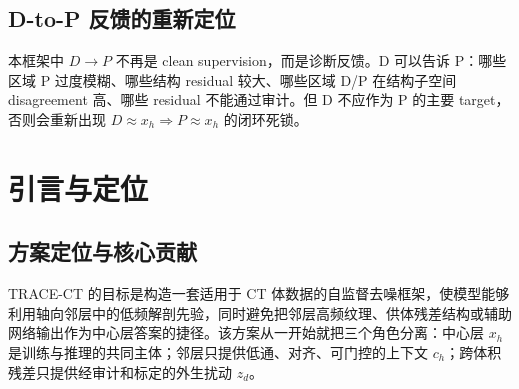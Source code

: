 \documentclass[11pt,a4paper,UTF8,fontset=fandol]{ctexart}
\theoremstyle{definition}
\begin{document}
\subsection{D-to-P 反馈的重新定位}

本框架中 $D\to P$ 不再是 clean supervision，而是诊断反馈。D 可以告诉 P：哪些区域 P 过度模糊、哪些结构 residual 较大、哪些区域 D/P 在结构子空间 disagreement 高、哪些 residual 不能通过审计。但 D 不应作为 P 的主要 target，否则会重新出现 $D\approx x_h\Rightarrow P\approx x_h$ 的闭环死锁。

\section{引言与定位}





\subsection{方案定位与核心贡献}

TRACE-CT 的目标是构造一套适用于 CT 体数据的自监督去噪框架，使模型能够利用轴向邻层中的低频解剖先验，同时避免把邻层高频纹理、供体残差结构或辅助网络输出作为中心层答案的捷径。该方案从一开始就把三个角色分离：中心层 $x_h$ 是训练与推理的共同主体；邻层只提供低通、对齐、可门控的上下文 $c_h$；跨体积残差只提供经审计和标定的外生扰动 $z_d$。
\end{document}

